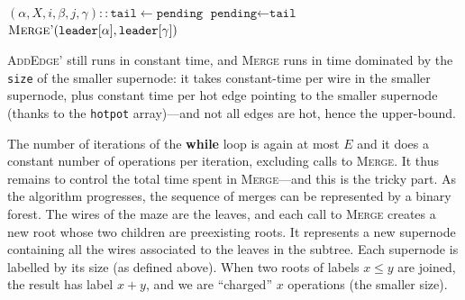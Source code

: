 \documentclass[a4paper,UKenglish,cleveref, autoref]{lipics-v2021}
\newcommand{\bigO}[1]{\ensuremath{\mathcal{O}\left( #1 \right)} }
\begin{document}
\begin{algorithm}
\begin{algorithmic}[1]
                                    
  \State $(\alpha, X, i, \beta, j, \gamma) :: \texttt{tail} \gets \texttt{pending}$     
  \State $\texttt{pending} \gets \texttt{tail}$    
                     
  \State $\Call{Merge'}{\texttt{leader}[\alpha], \texttt{leader}[\gamma]}$                                   
  \EndIf
  \EndWhile
  \EndProcedure
\end{algorithmic}
\caption{Algorithm to collapse sparse recursive mazes. \label{algo:main-sparse}}
\end{algorithm}

\textsc{AddEdge'} still runs in constant time, and \textsc{Merge}
runs in time dominated by the \texttt{size} of the smaller supernode: it takes
constant-time per wire in the smaller supernode, plus constant time per hot edge
pointing to the smaller supernode (thanks to the \texttt{hotpot} array)---and
not all edges are hot, hence the upper-bound.


The number of iterations of the \textbf{while} loop is again at most $E$ and it
does a constant number of operations per iteration, excluding calls to
\textsc{Merge}. It thus remains to control the total time spent in
\textsc{Merge}---and this is the tricky part. As the algorithm progresses, the
sequence of merges can be represented by a binary forest. The wires of the maze
are the leaves, and each call to \textsc{Merge} creates a new root whose two
children are preexisting roots. It represents a new supernode containing all the
wires associated to the leaves in the subtree. Each supernode is labelled by its
size (as defined above). When two roots of labels $x \leq y$ are joined, the
result has label $x + y$, and we are ``charged'' $x$ operations (the smaller
size).

\end{document}
